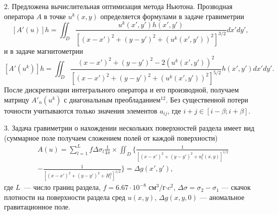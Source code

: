 \documentclass[%
autoref,     %
href,        %
facsimile,   %
colorlinks,  %
]{disser}
\begin{document}
2. Предложена вычислительная оптимизация метода Ньютона. Прозводная оператора $A$ в точке $u^k(x,y)$ определяется формулами в задаче гравиметрии
$$ [A'(u)]h=\iint_{D} \frac{u^k(x',y')h(x',y')}{[(x-x')^2+(y-y')^2+(u^k(x',y'))^2]^{3/2}}dx'dy',$$
и в задаче магнитометрии
$$ [A'(u^k)]h=\iint_{D} \frac{(x-x')^2+(y-y')^2-2(u^k(x',y'))^2}{[(x-x')^2+(y-y')^2+(u^k(x',y'))^2]^{5/2}}h(x',y')dx'dy'.$$
После дискретизации интегрального оператора и его производной, получаем матрицу $A'_n(u^k)$ с диагональным преобладанием$^{12}$.
Без существенной потери точности учитываются только значения элементов $a_{ij}$, где $i+j\in[i-\beta;i+\beta]$.
{\scriptsize
	\let\thefootnote\relax\let\thefootnote\relax{}
	}

3. Задача гравиметрии о нахождении нескольких поверхностей раздела имеет вид (суммарное поле получаем сложением полей от каждой поверхности)
\begin{equation}\label{equ_grav_multi}
		\begin{aligned}
		& A(u)=\sum_{l=1}^{L}f\Delta\sigma_l\frac{1}{4\pi}\times 
		\iint_D\bigg\{\frac{1}{[(x-x')^2+(y-y')^2+u_l^2(x,y)]^{1/2}} \\
		&-\frac{1}{[(x-x')^2+(y-y')^2+H_l^2]^{1/2}}\bigg\}=\Delta g(x',y'),
		\end{aligned}
\end{equation}		
где $L$~--- число границ раздела, $f=6.67\cdot10^{-8}$ см$^3/$г$\cdot c^2$, $\Delta\sigma=\sigma_2-\sigma_1$ --- скачок плотности на поверхности раздела сред $u(x,y)$, $\Delta g(x,y,0)$ --- аномальное гравитационное поле.
\end{document}
